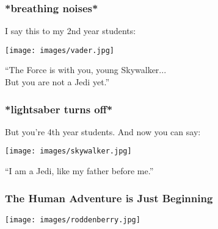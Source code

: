 \begin{frame}
\frametitle{*breathing noises*}

I say this to my 2nd year students:

\begin{center}
	\texttt{[image: images/vader.jpg]}
\end{center}

``The Force is with you, young Skywalker...\\
\quad But you are not a Jedi yet.''


\end{frame}


\begin{frame}
\frametitle{*lightsaber turns off*}

But you're 4th year students. And now you can say:
\begin{center}
	\texttt{[image: images/skywalker.jpg]}
\end{center}

``I am a Jedi, like my father before me.''

\end{frame}


\begin{frame}
\frametitle{The Human Adventure is Just Beginning}

\begin{center}
	\texttt{[image: images/roddenberry.jpg]}
\end{center}

\end{frame}




